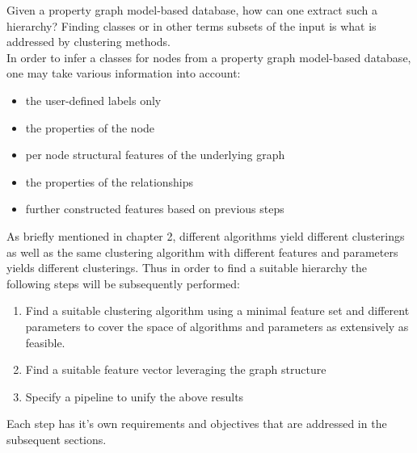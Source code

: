 Given a property graph model-based database, how can one extract such a hierarchy?
Finding classes or in other terms subsets of the input is what is addressed by clustering methods. \\
In order to infer a classes for nodes from a property graph model-based database, one may take various information into account: 
\begin{itemize}
    \item the user-defined labels only
    \item the properties of the node
    \item per node structural features of the underlying graph
    \item the properties of the relationships
    \item further constructed features based on previous steps
\end{itemize}
As briefly mentioned in chapter 2, different algorithms yield different clusterings as well as the same clustering algorithm with different features and parameters yields different clusterings. Thus in order to find a suitable hierarchy the following steps will be subsequently performed:
\begin{enumerate}
    \item Find a suitable clustering algorithm using a minimal feature set and different parameters to cover the space of algorithms and parameters as extensively as feasible.
    \item Find a suitable feature vector leveraging the graph structure
    \item Specify a pipeline to unify the above results
\end{enumerate}
Each step has it's own requirements and objectives that are addressed in the subsequent sections. \\

